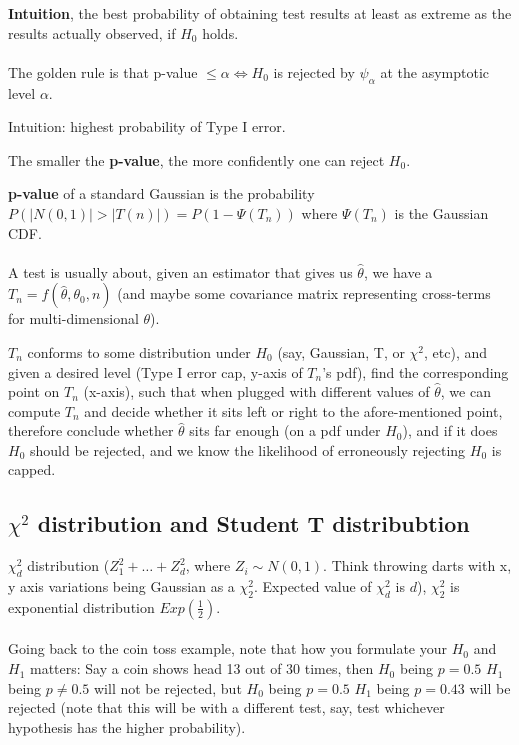 \documentclass{article}
\begin{document}
\textbf{Intuition}, the best probability of obtaining test results at least as extreme as the results actually observed, if $H_0$ holds.
\\
\\
The golden rule is that p-value $\leq \alpha \iff H_0$ is rejected by $\psi_{\alpha}$ at the asymptotic level $\alpha$.

Intuition: highest probability of Type I error.

The smaller the \textbf{p-value}, the more confidently one can reject $H_0$.

\textbf{p-value} of a standard Gaussian is the probability $P(| N(0, 1) | > | T(n) |) = P(1 - \Psi(T_n))$ where $\Psi(T_n)$ is the Gaussian CDF.
\\
\\
A test is usually about, given an estimator that gives us $\hat{\theta}$, we have a $T_n = f(\hat{\theta}, \theta_0, n)$ (and maybe some covariance matrix representing cross-terms for multi-dimensional $\theta$).

$T_n$ conforms to some distribution under $H_0$ (say, Gaussian, T, or $\chi^2$, etc),
and given a desired level (Type I error cap, y-axis of $T_n$'s pdf), find the corresponding point on $T_n$ (x-axis),
such that when plugged with different values of $\hat{\theta}$, we can compute $T_n$ and decide whether it sits left or right to the afore-mentioned point,
therefore conclude whether $\hat{\theta}$ sits far enough (on a pdf under $H_0$), and if it does $H_0$ should be rejected,
and we know the likelihood of erroneously rejecting $H_0$ is capped.

\subsection{$\chi^2$ distribution and Student T distribubtion}

$\chi_{d}^2$ distribution ($Z_1^2 + \dots + Z_d^2$, where $Z_i \sim N(0, 1)$. Think throwing darts with x, y axis variations being Gaussian as a $\chi_{2}^2$. Expected value of $\chi_{d}^2$ is $d$), $\chi_2^{2}$ is exponential distribution $Exp(\frac{1}{2})$.
\\
\\
Going back to the coin toss example, note that how you formulate your $H_0$ and $H_1$ matters:
Say a coin shows head 13 out of 30 times, then
$H_0$ being $p = 0.5$ $H_1$ being $p \neq 0.5$ will not be rejected, but
$H_0$ being $p = 0.5$ $H_1$ being $p = 0.43$ will be rejected (note that this will be with a different test, say, test whichever hypothesis has the higher probability).
\end{document}
